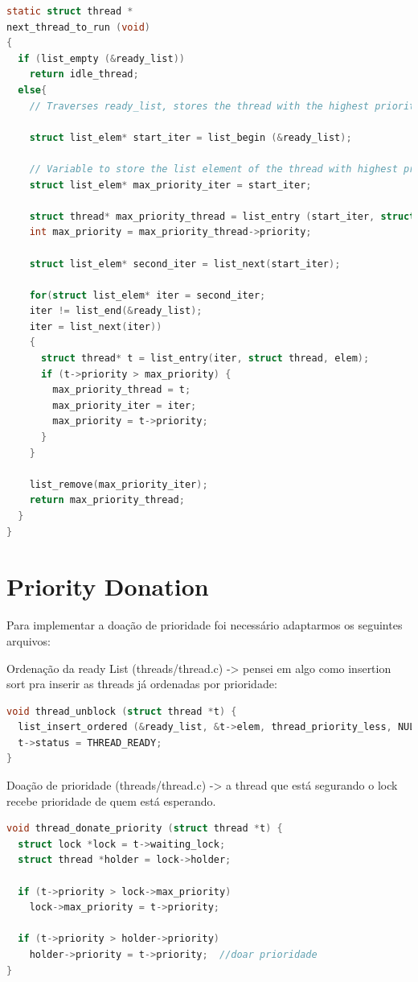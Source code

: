 \documentclass{article}
\begin{document}
\begin{lstlisting}[language=C]
static struct thread *
next_thread_to_run (void) 
{
  if (list_empty (&ready_list))
    return idle_thread;
  else{
    // Traverses ready_list, stores the thread with the highest priority, removes it from the list and return it.
    
    struct list_elem* start_iter = list_begin (&ready_list);

    // Variable to store the list element of the thread with highest priority to remove it at the end of the function
    struct list_elem* max_priority_iter = start_iter;

    struct thread* max_priority_thread = list_entry (start_iter, struct thread, elem);
    int max_priority = max_priority_thread->priority;

    struct list_elem* second_iter = list_next(start_iter);

    for(struct list_elem* iter = second_iter;
    iter != list_end(&ready_list);
    iter = list_next(iter))
    {
      struct thread* t = list_entry(iter, struct thread, elem);
      if (t->priority > max_priority) {
        max_priority_thread = t;
        max_priority_iter = iter;
        max_priority = t->priority;
      }
    }

    list_remove(max_priority_iter);
    return max_priority_thread;
  }
}
\end{lstlisting}

\section*{Priority Donation}
Para implementar a doação de prioridade foi necessário adaptarmos os seguintes arquivos:


Ordenação da ready List (threads/thread.c) -> pensei em algo como insertion sort pra inserir as threads já ordenadas por prioridade: 
\newpage


\begin{lstlisting}[language=C]
void thread_unblock (struct thread *t) {
  list_insert_ordered (&ready_list, &t->elem, thread_priority_less, NULL);
  t->status = THREAD_READY;
}
\end{lstlisting}

\hfill \break

Doação de prioridade (threads/thread.c) -> a thread que está segurando o lock recebe prioridade de quem está esperando.


\begin{lstlisting}[language=C]
void thread_donate_priority (struct thread *t) {
  struct lock *lock = t->waiting_lock;
  struct thread *holder = lock->holder;

  if (t->priority > lock->max_priority)
    lock->max_priority = t->priority;

  if (t->priority > holder->priority)
    holder->priority = t->priority;  //doar prioridade
}
\end{lstlisting}
\end{document}
